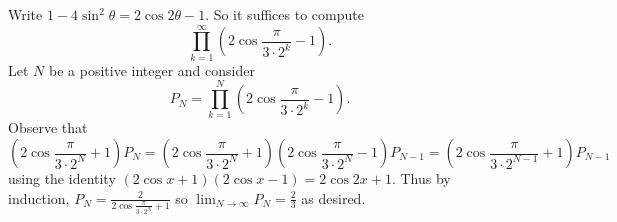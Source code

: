 Write $1-4\sin^2\theta=2\cos2\theta-1$. So it suffices to compute
\[
	\prod_{k=1}^{\infty}\left(2\cos\frac{\pi}{3\cdot2^k}-1\right).
\]
Let $N$ be a positive integer and consider
\[
	P_N=\prod_{k=1}^N\left(2\cos\frac{\pi}{3\cdot2^k}-1\right).
\]
Observe that
\[
	\left(2\cos\frac{\pi}{3\cdot2^N}+1\right)P_N=\left(2\cos\frac{\pi}{3\cdot2^N}+1\right)\left(2\cos\frac{\pi}{3\cdot2^N}-1\right)P_{N-1}=\left(2\cos\frac{\pi}{3\cdot2^{N-1}}+1\right)P_{N-1}
\]
using the identity $\left(2\cos x+1\right)\left(2\cos x-1\right)=2\cos2x+1$. Thus by induction, $P_N=\frac{2}{2\cos\frac{\pi}{3\cdot2^N}+1}$ so $\displaystyle\lim_{N\to\infty}P_N=\boxed{\frac{2}{3}}$ as desired.